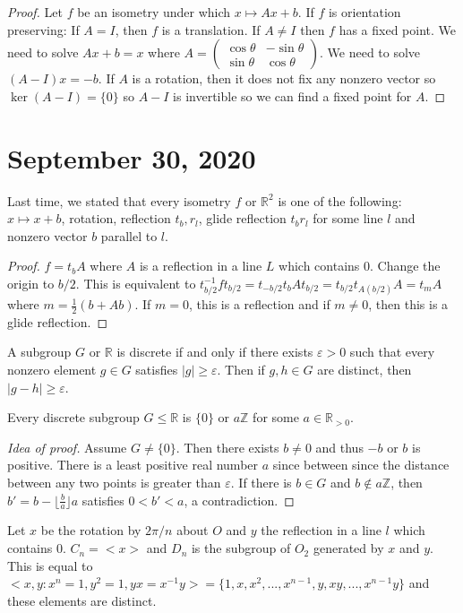 \documentclass{article}
\newcommand{\R}{\mathbb{R}}
\newcommand{\Z}{\mathbb{Z}}
\newcommand{\eps}{\varepsilon}
\begin{document}
\begin{proof}
Let $f$ be an isometry under which $x\mapsto Ax+b$. If $f$ is orientation preserving: If $A=I$, then $f$ is a translation. If $A\neq I$ then $f$ has a fixed point. We need to solve $Ax+b=x$ where $A=\begin{pmatrix}
\cos\theta&-\sin\theta\\\sin\theta&\cos\theta
\end{pmatrix}$. We need to solve $(A-I)x=-b$. If $A$ is a rotation, then it does not fix any nonzero vector so $\ker(A-I)=\{0\}$ so $A-I$ is invertible so we can find a fixed point for $A$. 
\end{proof}
\section{September 30, 2020}
Last time, we stated that every isometry $f$ or $\R^2$ is one of the following: $x\mapsto x+b$, rotation, reflection $t_b,r_l$, glide reflection $t_br_l$ for some line $l$ and nonzero vector $b$ parallel to $l$.
\begin{proof}
$f=t_bA$ where $A$ is a reflection in a line $L$ which contains 0. Change the origin to $b/2$. This is equivalent to $t^{-1}_{b/2}ft_{b/2}=t_{-b/2}t_bAt_{b/2}=t_{b/2}t_{A(b/2)}A=t_mA$ where $m=\frac{1}{2}(b+Ab)$. If $m=0$, this is a reflection and if $m\neq 0$, then this is a glide reflection. 
\end{proof}
\begin{definition}
A subgroup $G$ or $\R$ is discrete if and only if there exists $\eps>0$ such that every nonzero element $g\in G$ satisfies $|g|\geq \eps$. Then if $g,h\in G$ are distinct, then $|g-h|\geq\eps$.
\end{definition}
\begin{theorem}
Every discrete subgroup $G\leq \R$ is $\{0\}$ or $a\Z$ for some $a\in\R_{>0}$.  
\end{theorem}
\begin{proof}[Idea of proof]
Assume $G\neq\{0\}$. Then there exists $b\neq0$ and thus $-b$ or $b$ is positive. There is a least positive real number $a$ since between since the distance between any two points is greater than $\eps$. If there is $b\in G$ and $b\notin a\Z$, then $b'=b-\lfloor \frac{b}{a}\rfloor a$ satisfies $0<b'<a$, a contradiction. 
\end{proof}
\begin{definition}
Let $x$ be the rotation by $2\pi/n$ about $O$ and $y$ the reflection in a line $l$ which contains 0. $C_n=<x>$ and $D_n$ is the subgroup of $O_2$ generated by $x$ and $y$.  This is equal to $<x,y:x^n=1,y^2=1,yx=x^{-1}y>=\{1,x,x^2,...,x^{n-1},y,xy,...,x^{n-1}y\}$ and these elements are distinct. 
\end{definition}
\end{document}
